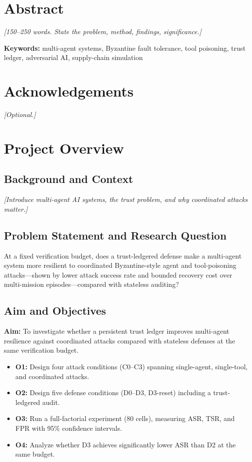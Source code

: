 \documentclass[a4paper, 11pt]{article}
\begin{document}
\newpage

\section*{Abstract}
\textit{[150--250 words. State the problem, method, findings, significance.]}

\textbf{Keywords:} multi-agent systems, Byzantine fault tolerance, tool poisoning, trust ledger, adversarial AI, supply-chain simulation

\section*{Acknowledgements}
\textit{[Optional.]}

\newpage
\tableofcontents
\newpage

\section{Project Overview}

\subsection{Background and Context}
\textit{[Introduce multi-agent AI systems, the trust problem, and why coordinated attacks matter.]}

\subsection{Problem Statement and Research Question}
At a fixed verification budget, does a trust-ledgered defense make a multi-agent system more resilient to coordinated Byzantine-style agent and tool-poisoning attacks---shown by lower attack success rate and bounded recovery cost over multi-mission episodes---compared with stateless auditing?

\subsection{Aim and Objectives}
\textbf{Aim:} To investigate whether a persistent trust ledger improves multi-agent resilience against coordinated attacks compared with stateless defenses at the same verification budget.

\begin{itemize}[nosep]
    \item \textbf{O1:} Design four attack conditions (C0--C3) spanning single-agent, single-tool, and coordinated attacks.
    \item \textbf{O2:} Design five defense conditions (D0--D3, D3-reset) including a trust-ledgered audit.
    \item \textbf{O3:} Run a full-factorial experiment (80 cells), measuring ASR, TSR, and FPR with 95\% confidence intervals.
    \item \textbf{O4:} Analyze whether D3 achieves significantly lower ASR than D2 at the same budget.
\end{itemize}
\end{document}
